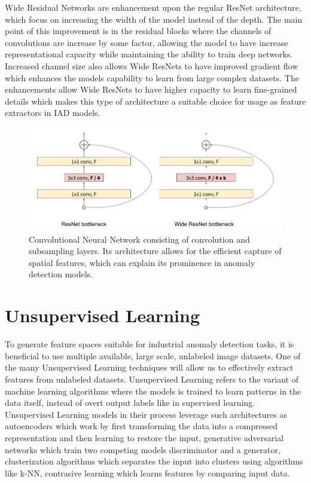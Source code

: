 Wide Residual Networks are enhancement upon the regular ResNet architecture, which focus on increasing the width of the model instead of the depth. The main point of this improvement is in the residual blocks where the channels of convolutions are increase by some factor, allowing the model to have increase representational capacity while maintaining the ability to train deep networks. Increased channel size also allows Wide ResNets to have improved gradient flow which enhances the models capability to learn from large complex datasets. The enhancements allow Wide ResNets to have higher capacity to learn fine-grained details which makes this type of architecture a suitable choice for usage as feature extractors in IAD models.

\begin{figure}[t]
	\begin{center}
		\includegraphics[width=1.0\linewidth]{Chapter_2/wide_resnet.png}
	\end{center}
	\caption{Convolutional Neural Network consisting of convolution and subsampling layers. Its architecture allows for the efficient capture of spatial features, which can explain its prominence in anomaly detection models.}
	\label{fig:cnn}
\end{figure}

\section{Unsupervised Learning}
\label{usupervised learning}

To generate feature spaces suitable for industrial anomaly detection tasks, it is beneficial to use multiple available, large scale, unlabeled image datasets. One of the many Unsupervised Learning techniques will allow us to effectively extract features from unlabeled datasets. Unsupervised Learning refers to the variant of machine learning algorithms where the models is trained to learn patterns in the data itself, instead of overt output labels like in supervised learning. Unsupervised Learning models in their process leverage such architectures as autoencoders which work by first transforming the data into a compressed representation and then learning to restore the input, generative adversarial networks which train two competing models discriminator and a generator, clusterization algorithms which separates the input into clusters using algorithms like k-NN, contrasive learning which learns features by comparing input data. 

